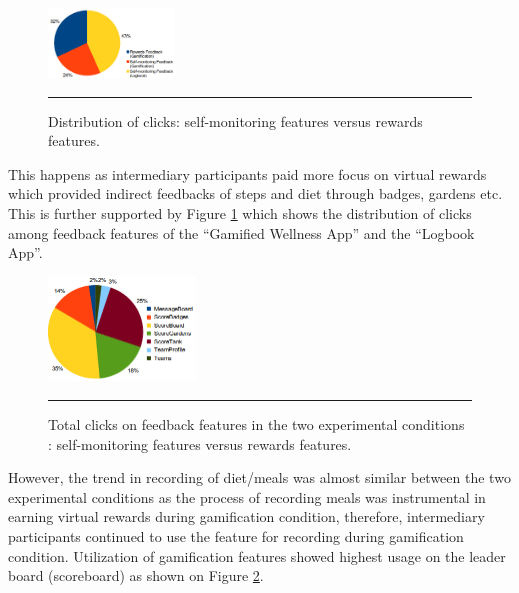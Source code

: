 \documentclass{sig-alternate}
\begin{document}
\begin{figure}[htbp]
  \centering
    \includegraphics[width=0.3\textwidth]{clicks_distr.png}
    \rule{26em}{0.5pt}
  \caption{Distribution of clicks: self-monitoring features versus rewards features.}
  \label{figure:clicks_distr}
\end{figure}\newline 
This happens as intermediary participants paid more focus on virtual rewards which provided indirect feedbacks of steps and diet through badges, gardens etc. This is further supported by Figure \ref{figure:clicks_distr} which shows the distribution of clicks among feedback features of the ``Gamified Wellness App'' and the ``Logbook App''.\newline 
\begin{figure}[htbp]
  \centering
    \includegraphics[width=0.35\textwidth]{clicks_rewards.png}
    \rule{26em}{0.5pt}
  \caption{Total clicks on feedback features in the two experimental conditions : self-monitoring features versus rewards features.}
  \label{figure:rewards_clicks}
\end{figure}\newline
However, the trend in recording of diet/meals was almost similar between the two experimental conditions as the process of recording meals was instrumental in earning virtual rewards during gamification condition, therefore, intermediary participants continued to use the feature for recording during gamification condition. Utilization of gamification features showed highest usage on the leader board (scoreboard) as shown on Figure \ref{figure:rewards_clicks}.\newline
\end{document}
